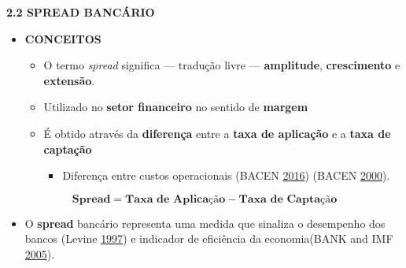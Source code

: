 \documentclass[ignorenonframetext,aspectratio=169,ignorenonframetext]{beamer}
\providecommand{\tightlist}{%
  \setlength{\itemsep}{0pt}\setlength{\parskip}{0pt}}
\begin{document}
\begin{frame}{\textbf{2.2 SPREAD BANCÁRIO}}
\protect\hypertarget{spread-bancuxe1rio}{}

\begin{itemize}
\tightlist
\item
  \textbf{CONCEITOS}

  \begin{itemize}
  \tightlist
  \item
    O termo \emph{spread} significa --- tradução livre ---
    \textbf{amplitude}, \textbf{crescimento} e \textbf{extensão}.
  \item
    Utilizado no \textbf{setor financeiro} no sentido de \textbf{margem}
  \item
    É obtido através da \textbf{diferença} entre a \textbf{taxa de
    aplicação} e a \textbf{taxa de captação}

    \begin{itemize}
    \tightlist
    \item
      Diferença entre custos operacionais (BACEN
      \protect\hyperlink{ref-BCB:2016}{2016}) (BACEN
      \protect\hyperlink{ref-BCB:2000}{2000}).
    \end{itemize}
  \end{itemize}
\end{itemize}

\[
\textbf{Spread} = \textbf{Taxa de Aplicação} - \textbf{Taxa de Captação}
\]

\begin{itemize}
\tightlist
\item
  O \textbf{spread} bancário representa uma medida que sinaliza o
  desempenho dos bancos (Levine
  \protect\hyperlink{ref-levine:1997}{1997}) e indicador de eficiência
  da economia(BANK and IMF \protect\hyperlink{ref-WB:2005}{2005}).
\end{itemize}

\end{frame}
\end{document}
